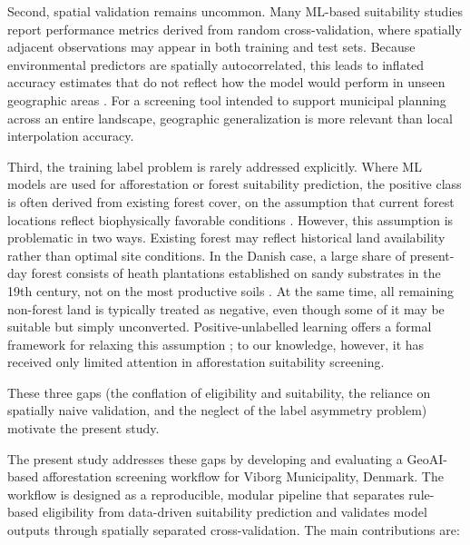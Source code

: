 \documentclass[land,article,submit,moreauthors]{Definitions/mdpi}
\begin{document}
Second, spatial validation remains uncommon. Many ML-based suitability studies report performance metrics derived from random cross-validation, where spatially adjacent observations may appear in both training and test sets. Because environmental predictors are spatially autocorrelated, this leads to inflated accuracy estimates that do not reflect how the model would perform in unseen geographic areas \citep{meyer2022,roberts2017}. For a screening tool intended to support municipal planning across an entire landscape, geographic generalization is more relevant than local interpolation accuracy.

Third, the training label problem is rarely addressed explicitly. Where ML models are used for afforestation or forest suitability prediction, the positive class is often derived from existing forest cover, on the assumption that current forest locations reflect biophysically favorable conditions \citep{chen2019,buthelezi2024review}. However, this assumption is problematic in two ways. Existing forest may reflect historical land availability rather than optimal site conditions. In the Danish case, a large share of present-day forest consists of heath plantations established on sandy substrates in the 19th century, not on the most productive soils \citep{sorensen2024}. At the same time, all remaining non-forest land is typically treated as negative, even though some of it may be suitable but simply unconverted. Positive-unlabelled learning offers a formal framework for relaxing this assumption \citep{elkan2008,bekker2020}; to our knowledge, however, it has received only limited attention in afforestation suitability screening.

These three gaps (the conflation of eligibility and suitability, the reliance on spatially naive validation, and the neglect of the label asymmetry problem) motivate the present study.


The present study addresses these gaps by developing and evaluating a GeoAI-based afforestation screening workflow for Viborg Municipality, Denmark. The workflow is designed as a reproducible, modular pipeline that separates rule-based eligibility from data-driven suitability prediction and validates model outputs through spatially separated cross-validation. The main contributions are:
\end{document}
